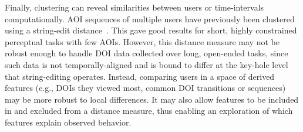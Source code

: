 Finally, clustering can reveal similarities between users or time-intervals computationally. AOI sequences of multiple users have previously been clustered using a string-edit distance~\cite{kurzhals2014iseecube}. This gave good results for short, highly constrained perceptual tasks with few AOIs. However, this distance measure may not be robust enough to handle DOI data collected over long, open-ended tasks, since such data is not temporally-aligned and is bound to differ at the key-hole level that string-editing operates. Instead, comparing users in a space of derived features (e.g., DOIs they viewed most, common DOI transitions or sequences) may be more robust to local differences. It may also allow features to be included in and excluded from a distance measure, thus enabling an exploration of which features explain observed behavior.


